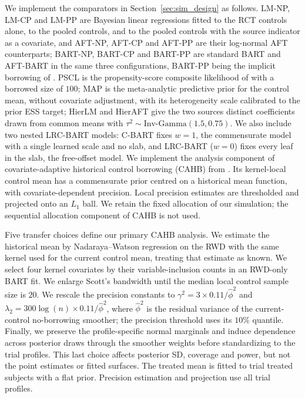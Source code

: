 We implement the comparators in Section~\ref{sec:sim_design} as follows. LM-NP, LM-CP and LM-PP are Bayesian linear regressions fitted to the RCT controls alone, to the pooled controls, and to the pooled controls with the source indicator as a covariate, and AFT-NP, AFT-CP and AFT-PP are their log-normal AFT counterparts; BART-NP, BART-CP and BART-PP are standard BART and AFT-BART \citep{Chipman2010BART,Sparapani2021BART} in the same three configurations, BART-PP being the implicit borrowing of \citet{ZhouJi2021}. PSCL is the propensity-score composite likelihood of \citet{Chen2020PSCL} with a borrowed size of $100$; MAP is the meta-analytic predictive prior for the control mean, without covariate adjustment, with its heterogeneity scale calibrated to the prior ESS target; HierLM and HierAFT give the two sources distinct coefficients drawn from common means with $\tau^2\sim\text{Inv-Gamma}(1.5,0.75)$. We also include two nested LRC-BART models: C-BART fixes $w=1$, the commensurate model with a single learned scale and no slab, and LRC-BART ($w=0$) fixes every leaf in the slab, the free-offset model.
We implement the analysis component of covariate-adaptive historical control borrowing (CAHB) from \citet{Jin2023CAHB}. Its kernel-local control mean has a commensurate prior centred on a historical mean function, with covariate-dependent precision. Local precision estimates are thresholded and projected onto an $L_1$ ball. We retain the fixed allocation of our simulation; the sequential allocation component of CAHB is not used.

Five transfer choices define our primary CAHB analysis. We estimate the historical mean by Nadaraya--Watson regression on the RWD with the same kernel used for the current control mean, treating that estimate as known. We select four kernel covariates by their variable-inclusion counts in an RWD-only BART fit. We enlarge Scott's bandwidth until the median local control sample size is $20$. We rescale the precision constants to $\gamma^2=3\times0.11/\hat\phi^2$ and $\lambda_2=300\log(n)\times0.11/\hat\phi^2$, where $\hat\phi^2$ is the residual variance of the current-control no-borrowing smoother; the precision threshold uses its $10\%$ quantile. Finally, we preserve the profile-specific normal marginals and induce dependence across posterior draws through the smoother weights before standardizing to the trial profiles. This last choice affects posterior SD, coverage and power, but not the point estimates or fitted surfaces. The treated mean is fitted to trial treated subjects with a flat prior. Precision estimation and projection use all trial profiles.

